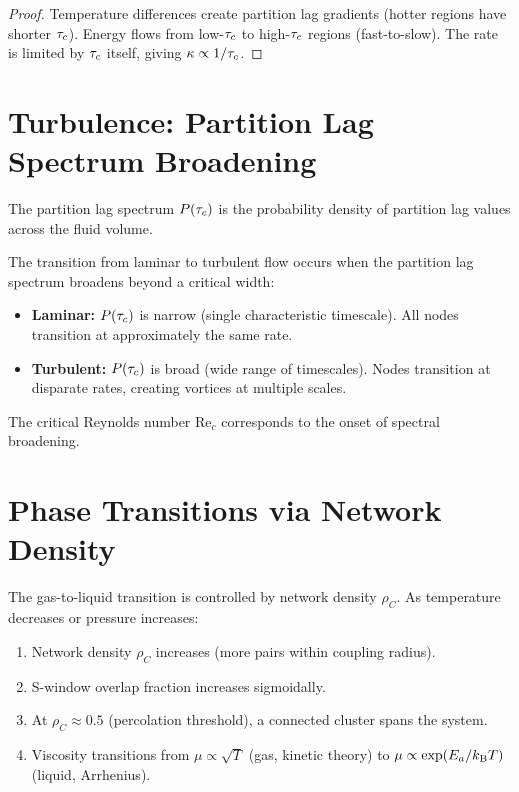 \begin{proof}
Temperature differences create partition lag gradients (hotter regions have shorter $\tau_c$). Energy flows from low-$\tau_c$ to high-$\tau_c$ regions (fast-to-slow). The rate is limited by $\tau_c$ itself, giving $\kappa \propto 1/\tau_c$.
\end{proof}

\section{Turbulence: Partition Lag Spectrum Broadening}
\label{sec:turbulence}

\begin{definition}
\label{def:lag_spectrum}
The partition lag spectrum $P(\tau_c)$ is the probability density of partition lag values across the fluid volume.
\end{definition}

\begin{theorem}
\label{thm:turbulence}
The transition from laminar to turbulent flow occurs when the partition lag spectrum broadens beyond a critical width:
\begin{itemize}
    \item \textbf{Laminar:} $P(\tau_c)$ is narrow (single characteristic timescale). All nodes transition at approximately the same rate.
    \item \textbf{Turbulent:} $P(\tau_c)$ is broad (wide range of timescales). Nodes transition at disparate rates, creating vortices at multiple scales.
\end{itemize}
The critical Reynolds number $\mathrm{Re}_c$ corresponds to the onset of spectral broadening.
\end{theorem}

\section{Phase Transitions via Network Density}
\label{sec:phase_transition}

The gas-to-liquid transition is controlled by network density $\rho_C$. As temperature decreases or pressure increases:
\begin{enumerate}
    \item Network density $\rho_C$ increases (more pairs within coupling radius).
    \item S-window overlap fraction increases sigmoidally.
    \item At $\rho_C \approx 0.5$ (percolation threshold), a connected cluster spans the system.
    \item Viscosity transitions from $\mu \propto \sqrt{T}$ (gas, kinetic theory) to $\mu \propto \exp(E_a/k_{\mathrm{B}} T)$ (liquid, Arrhenius).
\end{enumerate}

